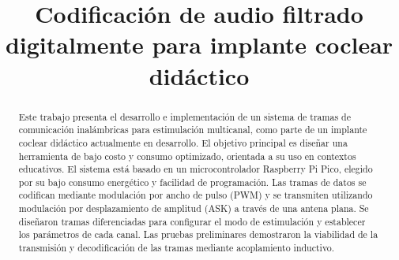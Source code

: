 \documentclass[conference]{IEEEtran}
\begin{document}
\title{Codificación de audio filtrado digitalmente para implante coclear didáctico}

\author{
\and
{}
\and
{}
\and
{}
\and
{}
}

\maketitle

\begin{abstract}
Este trabajo presenta el desarrollo e implementación de un sistema de tramas de comunicación inalámbricas para estimulación multicanal, como parte de un implante coclear didáctico actualmente en desarrollo. El objetivo principal es diseñar una herramienta de bajo costo y consumo optimizado, orientada a su uso en contextos educativos. El sistema está basado en un microcontrolador Raspberry Pi Pico, elegido por su bajo consumo energético y facilidad de programación. Las tramas de datos se codifican mediante modulación por ancho de pulso (PWM) y se transmiten utilizando modulación por desplazamiento de amplitud (ASK) a través de una antena plana. Se diseñaron tramas diferenciadas para configurar el modo de estimulación y establecer los parámetros de cada canal. Las pruebas preliminares demostraron la viabilidad de la transmisión y decodificación de las tramas mediante acoplamiento inductivo.
\end{abstract}
\end{document}
